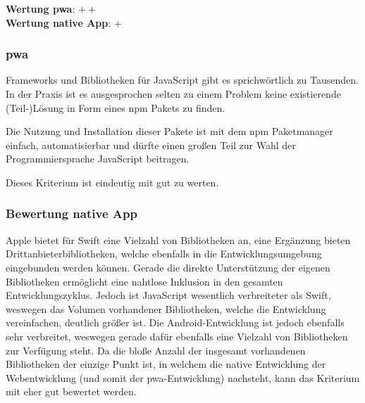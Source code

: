\textbf{Wertung \ac{pwa}}: $++$\\
\textbf{Wertung native App}: $+$ \\

\subsubsection{\ac{pwa}}
Frameworks und Bibliotheken für JavaScript gibt es sprichwörtlich zu Tausenden. In der Praxis ist es ausgesprochen selten zu einem Problem keine existierende (Teil-)Lösung in Form eines npm Pakets zu finden.

Die Nutzung und Installation dieser Pakete ist mit dem npm Paketmanager einfach, automatisierbar und dürfte einen großen Teil zur Wahl der Programmiersprache JavaScript beitragen.

Dieses Kriterium ist eindeutig mit gut zu werten.

\subsubsection{Bewertung native App}
Apple bietet für Swift eine Vielzahl von Bibliotheken an, eine Ergänzung bieten Drittanbieterbibliotheken, welche ebenfalls in die Entwicklungsumgebung eingebunden werden können. Gerade die direkte Unterstützung der eigenen Bibliotheken ermöglicht eine nahtlose Inklusion in den gesamten Entwicklungszyklus. Jedoch ist JavaScript wesentlich verbreiteter als Swift, weswegen das Volumen vorhandener Bibliotheken, welche die Entwicklung vereinfachen, deutlich größer ist. Die Android-Entwicklung ist jedoch ebenfalls sehr verbreitet, weswegen gerade dafür ebenfalls eine Vielzahl von Bibliotheken zur Verfügung steht. Da die bloße Anzahl der insgesamt vorhandenen Bibliotheken der einzige Punkt ist, in welchem die native Entwicklung der Webentwicklung (und somit der \ac{pwa}-Entwicklung) nachsteht, kann das Kriterium mit eher gut bewertet werden.